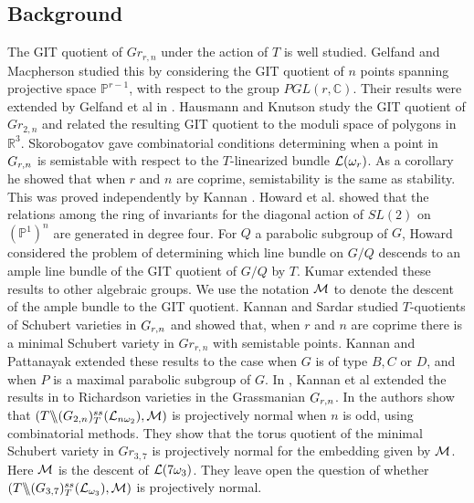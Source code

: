 \subsection{Background}
The GIT quotient of $Gr_{r,n}$ under the action of $T$ is well studied. Gelfand and Macpherson \cite{gelfand1982geometry} studied this by considering the GIT quotient of
$n$ points spanning projective space ${\mathbb P}^{r-1}$, with respect to the group $PGL(r,\mathbb{C})$. Their results were extended by Gelfand et al in \cite{gelfand1987combinatorial}. Hausmann and Knutson\cite{hausmann1997polygon} study the GIT quotient of $Gr_{2,n}$ and related the resulting GIT quotient to the moduli space of polygons in ${\mathbb R}^3$. Skorobogatov \cite{skorobogatov1993swinnerton} gave combinatorial conditions determining when a point in $G_{{r},{n}}$ is semistable with respect to the $T$-linearized bundle ${\cal L}(\omega_r)$. As a corollary he showed that when $r$ and $n$ are coprime, semistability is the same as stability. This was proved independently by  Kannan \cite{kannan1998torus}. Howard et al. \cite{howard2005projective} showed that the relations among the ring of invariants for the diagonal action of $SL(2)$ on $({\mathbb P}^1)^n$ are generated in degree four.  For $Q$ a parabolic subgroup of $G$, Howard \cite{howard2005matroids} considered the problem of determining which line bundle on $G/Q$ descends to an ample line bundle of the GIT quotient of $G/Q$ by $T$. Kumar \cite{kumar2008descent} extended these results to other algebraic groups. We use the notation ${\cal M}$ to denote the descent of the ample bundle to the GIT quotient.  Kannan and Sardar \cite{kannan2009torusA}  studied $T$-quotients of Schubert varieties in $G_{{r},{n}}$ and showed that, when $r$ and $n$ are coprime there is a minimal Schubert variety in $Gr_{r,n}$ with semistable points. Kannan and Pattanayak extended these results to the case when $G$ is of type $B,C$ or $D$, and when $P$ is a maximal parabolic subgroup of $G$.  In \cite{kannan2018torus}, Kannan et al extended the results in \cite{kannan2009torusA} to Richardson varieties in the Grassmanian $G_{{r},{n}}$. 
In \cite{bakshi2020torus} the authors show that $(T \backslash\mkern-6mu\backslash (G_{{2},{n}})^{ss}_T{ ({\cal L}_{n\omega_2})}, {\cal M})$ is projectively normal when $n$ is odd, using combinatorial methods. They show that the torus quotient of the  minimal Schubert variety in $Gr_{3,7}$ is projectively normal for the embedding given by ${\cal M}$. Here ${\cal M}$ is the descent of ${\cal L}(7 \omega_3)$.  They leave open the question of whether $(T \backslash\mkern-6mu\backslash (G_{{3},{7}})^{ss}_T{ ({\cal L}_{\omega_3})}, {\cal M})$ is projectively normal.



